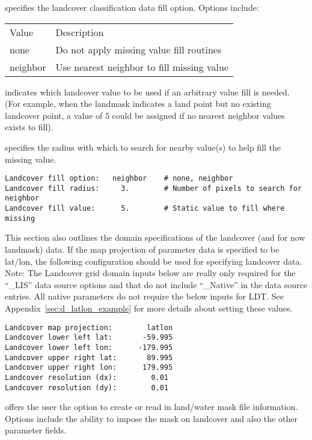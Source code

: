  
  specifies the landcover classification
  data fill option.  Options include:

 \begin{tabular}{ll}
 Value      & Description                                  \\
 none       &  Do not apply missing value fill routines    \\
 neighbor   &  Use nearest neighbor to fill missing value  \\
 \end{tabular}

  indicates which landcover
 value to be used if an arbitrary value fill is needed. 
 (For example, when the landmask indicates a land point but no existing 
 landcover point, a value of 5 could be assigned if 
 no nearest neighbor values exists to fill).

  specifies the radius with which
 to search for nearby value(s) to help fill the missing value.
 

 \begin{Verbatim}[frame=single]
Landcover fill option:   neighbor    # none, neighbor
Landcover fill radius:     3.        # Number of pixels to search for neighbor
Landcover fill value:      5.        # Static value to fill where missing
 \end{Verbatim}

 
 This section also outlines the domain specifications of the 
 landcover (and for now landmask) data. 
 If the map projection of parameter data is specified to be lat/lon, 
 the following configuration should be used for specifying landcover
 data.
 Note: The Landcover grid domain inputs below are really only required
  for the ``\_LIS'' data source options and that do not include ``\_Native''
  in the data source entries. All native parameters do not require
  the below inputs for LDT.
 See Appendix~\ref{sec:d_latlon_example} for more details about
 setting these values. 
 

 \begin{Verbatim}[frame=single]
Landcover map projection:        latlon
Landcover lower left lat:       -59.995
Landcover lower left lon:      -179.995
Landcover upper right lat:       89.995
Landcover upper right lon:      179.995
Landcover resolution (dx):        0.01
Landcover resolution (dy):        0.01
 \end{Verbatim}

 
  offers the user the option
 to create or read in land/water mask file information.
 Options include the ability to impose the mask on landcover
 and also the other parameter fields.
 

